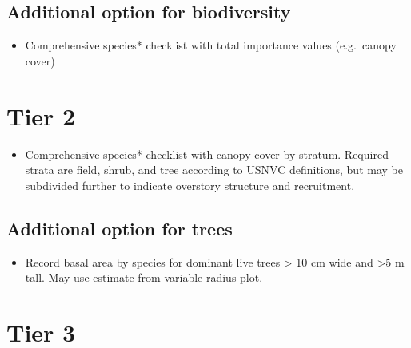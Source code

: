 \documentclass[
]{book}
\providecommand{\tightlist}{%
  \setlength{\itemsep}{0pt}\setlength{\parskip}{0pt}}
\begin{document}
\hypertarget{additional-option-for-biodiversity}{%
\subsection*{Additional option for biodiversity}\label{additional-option-for-biodiversity}}

\begin{itemize}
\tightlist
\item
  Comprehensive species* checklist with total importance values (e.g.~canopy cover)
\end{itemize}

\hypertarget{tier-2}{%
\section{Tier 2}\label{tier-2}}

\begin{itemize}
\tightlist
\item
  Comprehensive species* checklist with canopy cover by stratum. Required strata are field, shrub, and tree according to USNVC definitions, but may be subdivided further to indicate overstory structure and recruitment.
\end{itemize}

\hypertarget{additional-option-for-trees}{%
\subsection*{Additional option for trees}\label{additional-option-for-trees}}

\begin{itemize}
\tightlist
\item
  Record basal area by species for dominant live trees \textgreater{} 10 cm wide and \textgreater5 m tall. May use estimate from variable radius plot.
\end{itemize}

\hypertarget{tier-3}{%
\section{Tier 3}\label{tier-3}}
\end{document}
